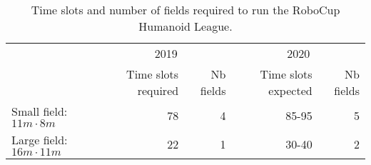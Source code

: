 \documentclass{article}
\begin{document}
\begin{table}[h]
  \centering
  \begin{tabular}{l|r|r|r|r|}
    & \multicolumn{2}{c}{2019} & \multicolumn{2}{c}{2020}\\
    & Time slots required & Nb fields & Time slots expected & Nb fields\\
    \hline
    Small field: $11m \cdot 8m$ & 78 & 4 & 85-95 & 5\\
    Large field: $16m \cdot 11m$ & 22 & 1 & 30-40 & 2\\
  \end{tabular}
  \caption{Time slots and number of fields required to run the RoboCup Humanoid League.}

\end{table}
\end{document}
